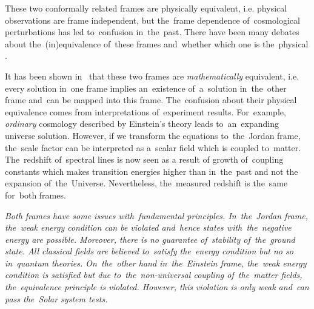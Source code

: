 These two conformally related frames are physically equivalent, i.e. physical observations are frame independent, but the~frame dependence of~cosmological perturbations has led to~confusion in~the~past. There have been many debates about the~(in)equivalence of~these frames \parencite{Postma:2014vaa} and~whether which one is the~physical \parencite{Faraoni:1999hp}.%

It has been shown in~\textcite{Magnano:1993bd} that these two frames are \textit{mathematically} equivalent, i.e. every solution in~one frame implies an~existence of~a~solution in~the~other frame and~can be mapped into this frame. The~confusion about their physical equivalence comes from interpretations of~experiment results. For~example, \textit{ordinary} cosmology described by Einstein’s theory leads to~an~expanding universe solution. However, if we transform the equations to~the~Jordan frame, the~scale factor can be interpreted as a~scalar field which is coupled to~matter. The~redshift of~spectral lines is now seen as a result of growth of~coupling constants which makes transition energies higher than in~the~past and not the expansion of~the~Universe. Nevertheless, the~measured redshift is the~same for~both frames.

{\itshape
Both frames have some issues with~fundamental principles. In~the~Jordan frame, the~weak energy condition can be violated and~hence states with~the~negative energy are possible. Moreover, there is no guarantee of~stability of~the~ground state. All \textit{classical} fields are believed to~satisfy the~energy condition but no so in~quantum theories. On~the~other hand in~the~Einstein frame, the~weak energy condition is satisfied but due to~the~non-universal coupling of~the~matter fields, the~equivalence principle is violated. However, this violation is only weak and~can pass the~Solar system tests.
}
